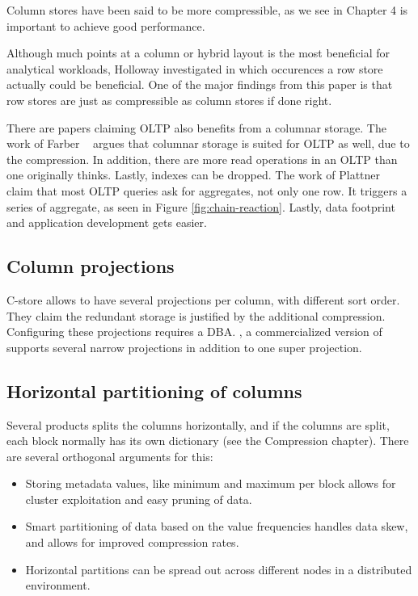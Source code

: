 Column stores have been said to be more compressible, as we see in Chapter 4 is important to achieve good performance.

Although much points at a column or hybrid layout is the most beneficial for analytical workloads, Holloway \ea \cite{Holloway2008-rr} investigated in which occurences a row store actually could be beneficial. One of the major findings from this paper is that row stores are just as compressible as column stores if done right.

There are papers claiming OLTP also benefits from a columnar storage. The work of Farber \ea~\cite{Farber2012-vh} argues that columnar storage is suited for OLTP as well, due to the compression. In addition, there are more read operations in an OLTP than one originally thinks. Lastly, indexes can be dropped. The work of Plattner \ea~\cite{Plattner2014-fr} claim that most OLTP queries ask for aggregates, not only one row. It triggers a series of aggregate, as seen in Figure \ref{fig:chain-reaction}. Lastly, data footprint and application development gets easier.

\subsection{Column projections}
\label{sub:Column projections}
C-store allows to have several projections per column, with different sort order. They claim the redundant storage is justified by the additional compression. Configuring these projections requires a DBA. , a commercialized version of  supports several narrow projections in addition to one super projection.

\subsection{Horizontal partitioning of columns}
\label{sub:Horizontal partitioning of columns}
Several products splits the columns horizontally, and if the columns are split, each block normally has its own dictionary (see the Compression chapter). There are several orthogonal arguments for this:
\begin{itemize}
  \item Storing metadata values, like minimum and maximum per block allows for cluster exploitation and easy pruning of data.
  \item Smart partitioning of data based on the value frequencies handles data skew, and allows for improved compression rates.
  \item Horizontal partitions can be spread out across different nodes in a distributed environment.
\end{itemize}

